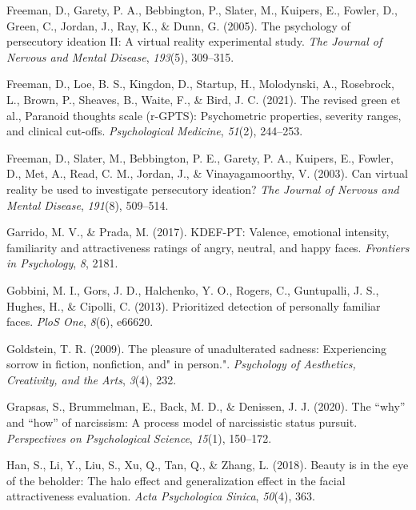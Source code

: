 \documentclass[
  man,floatsintext]{apa6}
\newlength{\cslhangindent}
\newlength{\cslentryspacingunit} %
\newenvironment{CSLReferences}[2] %
 {%
  \setlength{\parindent}{0pt}
  \ifodd #1
  \let\oldpar\par
  \def\par{\hangindent=\cslhangindent\oldpar}
  \fi
  \setlength{\parskip}{#2\cslentryspacingunit}
 }%
 {}
\begin{document}
\begin{CSLReferences}{1}{0}
\leavevmode{}%
Freeman, D., Garety, P. A., Bebbington, P., Slater, M., Kuipers, E., Fowler, D., Green, C., Jordan, J., Ray, K., \& Dunn, G. (2005). The psychology of persecutory ideation II: A virtual reality experimental study. \emph{The Journal of Nervous and Mental Disease}, \emph{193}(5), 309--315.

\leavevmode{}%
Freeman, D., Loe, B. S., Kingdon, D., Startup, H., Molodynski, A., Rosebrock, L., Brown, P., Sheaves, B., Waite, F., \& Bird, J. C. (2021). The revised green et al., Paranoid thoughts scale (r-GPTS): Psychometric properties, severity ranges, and clinical cut-offs. \emph{Psychological Medicine}, \emph{51}(2), 244--253.

\leavevmode{}%
Freeman, D., Slater, M., Bebbington, P. E., Garety, P. A., Kuipers, E., Fowler, D., Met, A., Read, C. M., Jordan, J., \& Vinayagamoorthy, V. (2003). Can virtual reality be used to investigate persecutory ideation? \emph{The Journal of Nervous and Mental Disease}, \emph{191}(8), 509--514.

\leavevmode{}%
Garrido, M. V., \& Prada, M. (2017). KDEF-PT: Valence, emotional intensity, familiarity and attractiveness ratings of angry, neutral, and happy faces. \emph{Frontiers in Psychology}, \emph{8}, 2181.

\leavevmode{}%
Gobbini, M. I., Gors, J. D., Halchenko, Y. O., Rogers, C., Guntupalli, J. S., Hughes, H., \& Cipolli, C. (2013). Prioritized detection of personally familiar faces. \emph{PloS One}, \emph{8}(6), e66620.

\leavevmode{}%
Goldstein, T. R. (2009). The pleasure of unadulterated sadness: Experiencing sorrow in fiction, nonfiction, and" in person.". \emph{Psychology of Aesthetics, Creativity, and the Arts}, \emph{3}(4), 232.

\leavevmode{}%
Grapsas, S., Brummelman, E., Back, M. D., \& Denissen, J. J. (2020). The {``why''} and {``how''} of narcissism: A process model of narcissistic status pursuit. \emph{Perspectives on Psychological Science}, \emph{15}(1), 150--172.

\leavevmode{}%
Han, S., Li, Y., Liu, S., Xu, Q., Tan, Q., \& Zhang, L. (2018). Beauty is in the eye of the beholder: The halo effect and generalization effect in the facial attractiveness evaluation. \emph{Acta Psychologica Sinica}, \emph{50}(4), 363.


\end{CSLReferences}
\end{document}
